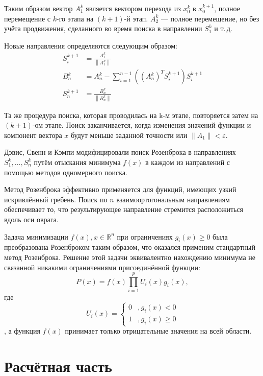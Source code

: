 \documentclass[a4paper,12pt,notitlepage,pdftex,headsepline]{scrartcl}
\begin{document}
  Таким образом вектор $A_1^k$ является вектором перехода из $x_0^k$ в
  $x_0^{k+1}$, полное перемещение с $k$-го этапа на $(k+1)$-й этап.
  $A_2^k$ --- полное перемещение, но без учёта продвижения, сделанного во
  время поиска в направлении $S_1^k$ и т.\,д.

  Новые направления определяются следующим образом:
  \begin{align}
    S_i^{k+1} &= \frac{A_1^k}{\left\|A_1^k\right\|} \\
    B_n^k &= A_n^k - \sum_{i = 1}^{n-1} \left( \left( A_n^k \right)^T
    S_i^{k+1} \right)S_i^{k + 1} \\
    S_n^{k+1} &= \frac{B_n^k}{\left\| B_n^k \right\|}
  \end{align}

  Та же процедура поиска, которая проводилась на k-м этапе, повторяется затем
  на $(k+1)$-ом этапе.
  Поиск заканчивается, когда изменения значений функции и компонент вектора
  $x$ будут меньше заданной точности или $\left\| A_1 \right\| < \varepsilon$.

  Дэвис, Свенн и Кэмпи модифицировали поиск Розенброка в направлениях
  $S_1^k,\dots, S_n^k$ путём отыскания минимума $f(x)$ в каждом из направлений
  с помощью методов одномерного поиска.

  Метод Розенброка эффективно применяется для функций, имеющих узкий искривлённый гребень.
  Поиск по $n$ взаимоортогональным направлениям обеспечивает то, что
  результирующее направление стремится расположиться вдоль оси оврага.

  Задача минимизации $f(x), x\in\mathbb{R}^n$ при ограничениях $g_i(x)
  \geqslant 0$ была преобразована Розенброком таким образом, что оказался
  применим стандартный метод Розенброка.
  Решение этой задачи эквивалентно нахождению минимума не связанной никакими
  ограничениями присоединённой функции:
  \begin{equation}
    P(x) = f(x) \prod_{i = 1}^p U_i(x) g_i(x),
  \end{equation}
  где
  \[
    U_i(x) =
    \begin{cases}
      0 &, g_i(x) < 0\\
      1 &, g_i(x) \geqslant 0
    \end{cases}
  \],
  а функция $f(x)$ принимает только отрицательные значения на всей области.

  \clearpage
\section{Расчётная часть}
\end{document}
